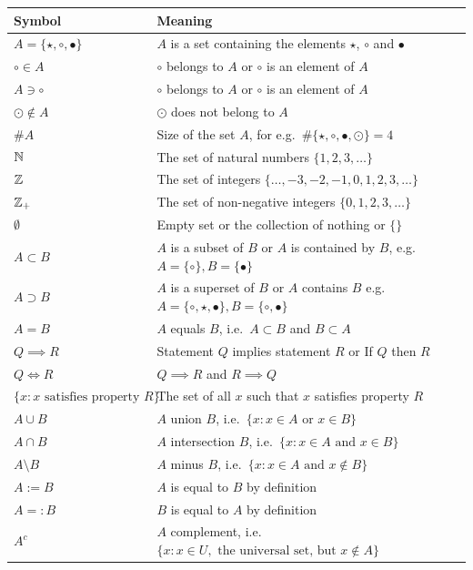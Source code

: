 \begin{table}[htb]
\centering
{\small
\begin{tabular}{| l | l |}
\hline
Symbol & Meaning\\ \hline
$A = \{ \star, \circ, \bullet \}$& $A$ is a set containing the elements $\star$, $\circ$ and $\bullet$ \\
$\circ \in A$ & $\circ$ belongs to $A$ or $\circ$ is an element of $A$\\
$A \ni \circ$ & $\circ$ belongs to $A$ or $\circ$ is an element of $A$\\
$\odot \notin A$& $\odot$ does not belong to $A$ \\
$\# A$& Size of the set $A$, for e.g.~$\#\{ \star, \circ, \bullet, \odot \}=4$\\
$\mathbb{N}$& The set of natural numbers $\{1,2,3,\ldots\}$\\
$\mathbb{Z}$&The set of integers $\{\ldots,-3,-2,-1,0,1,2,3,\ldots\}$\\
$\mathbb{Z}_+$& The set of non-negative integers $\{0,1,2,3,\ldots\}$\\
$\emptyset$&Empty set or the collection of nothing or $\{\}$\\
$A \subset B$ & $A$ is a subset of $B$ or $A$ is contained by $B$, e.g.~$A=\{\circ\}, B=\{\bullet\}$\\
$A \supset B$& $A$ is a superset of $B$ or $A$ contains $B$ e.g.~$A=\{\circ, \star,\bullet\}, B=\{\circ, \bullet\}$ \\
$A=B$ & $A$ equals $B$, i.e.~$A \subset B$ and  $B \subset A$\\
$Q \implies R$ & Statement $Q$ implies statement $R$ or If $Q$ then $R$ \\
$Q \iff R$ & $Q \implies R$ and $R \implies Q$ \\
$\{x: x \text{ satisfies property } R \}$& The set of all $x$ such that $x$ satisfies property $R$\\
$A \cup B$& $A$ union $B$, i.e.~$\{x: x\in A \text{ or } x \in B\}$\\
$A \cap B$& $A$ intersection $B$, i.e.~$\{x: x\in A \text{ and } x \in B\}$\\
$A \setminus B $& $A$ minus $B$, i.e.~$\{x: x\in A \text{ and } x \notin B\}$\\
$A:=B$& $A$ is equal to $B$ by definition\\
$A=:B$& $B$ is equal to $A$ by definition\\
$A^c$& $A$ complement, i.e.~$\{x: x\in U, \text{ the universal set, but } x \notin A\}$\\

\end{tabular}}
\end{table}
